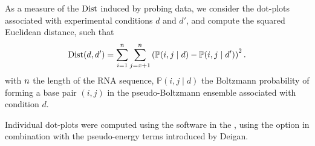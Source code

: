\documentclass[a4,center,fleqn]{NAR}
\begin{document}

As a measure of the  ${ \text{Dist}}$ induced by probing data, we consider the dot-plots associated with experimental conditions $d$ and $d'$, and compute the squared Euclidean distance, such that
\[{ \text{Dist}} (d,d')=\sum\limits_{i=1}^{n}\sum\limits_{j=x+1}^{n} \left(\mathbb{P}(i,j\mid d)-\mathbb{P}(i,j\mid d')\right)^2.\]
with ${n}$ the length of the RNA sequence,  $\mathbb{P}(i,j\mid d)$ the Boltzmann probability of forming a base pair $(i,j)$ in the pseudo-Boltzmann ensemble associated with condition $d$.


Individual dot-plots were computed using the  software in the , using the  option in combination with the pseudo-energy terms introduced by Deigan\etal\cite{Deigan2009}. 

\end{document}
